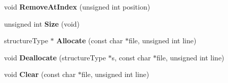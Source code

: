 \begin{DoxyCompactItemize}
\item 
\hypertarget{class_data_structures_1_1_threadsafe_allocating_queue_aa7a9ab0c4effa28652d64eb7624c810f}{void {\bfseries Remove\-At\-Index} (unsigned int position)}\label{class_data_structures_1_1_threadsafe_allocating_queue_aa7a9ab0c4effa28652d64eb7624c810f}

\item 
\hypertarget{class_data_structures_1_1_threadsafe_allocating_queue_aa2887f954c636f22b9463383ec7eb144}{unsigned int {\bfseries Size} (void)}\label{class_data_structures_1_1_threadsafe_allocating_queue_aa2887f954c636f22b9463383ec7eb144}

\item 
\hypertarget{class_data_structures_1_1_threadsafe_allocating_queue_aa95962ea9808cd598c13048c31c52c6e}{structure\-Type $\ast$ {\bfseries Allocate} (const char $\ast$file, unsigned int line)}\label{class_data_structures_1_1_threadsafe_allocating_queue_aa95962ea9808cd598c13048c31c52c6e}

\item 
\hypertarget{class_data_structures_1_1_threadsafe_allocating_queue_a0eec464ecd7aa8af770e1ceb406661bf}{void {\bfseries Deallocate} (structure\-Type $\ast$s, const char $\ast$file, unsigned int line)}\label{class_data_structures_1_1_threadsafe_allocating_queue_a0eec464ecd7aa8af770e1ceb406661bf}

\item 
\hypertarget{class_data_structures_1_1_threadsafe_allocating_queue_a48ffb49251ed59f0fbf54d0226e374e0}{void {\bfseries Clear} (const char $\ast$file, unsigned int line)}\label{class_data_structures_1_1_threadsafe_allocating_queue_a48ffb49251ed59f0fbf54d0226e374e0}

\end{DoxyCompactItemize}
